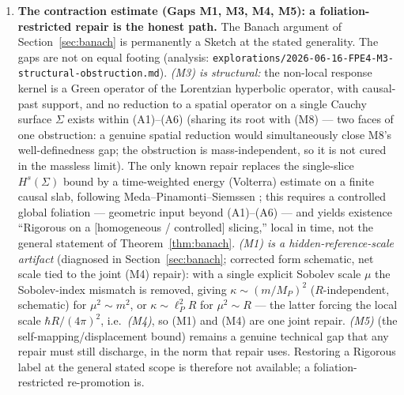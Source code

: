 \documentclass[12pt,a4paper]{article}
\begin{document}
\begin{enumerate}

\item \textbf{The contraction estimate (Gaps M1, M3, M4, M5): a foliation-restricted
repair is the honest path.} The Banach argument of Section~\ref{sec:banach} is
permanently a Sketch at the stated generality. The gaps are not on equal footing
(analysis: \texttt{explorations/2026-06-16-FPE4-M3-structural-obstruction.md}).
\emph{(M3) is structural:} the non-local response kernel is a Green operator of the
Lorentzian hyperbolic operator, with causal-past support, and no reduction to a spatial
operator on a single Cauchy surface $\Sigma$ exists within (A1)--(A6) (sharing its root
with (M8) --- two faces of one obstruction: a genuine spatial reduction would simultaneously
close M8's well-definedness gap; the obstruction is mass-independent, so it is not cured
in the massless limit). The
only known repair replaces the single-slice $H^s(\Sigma)$ bound by a time-weighted energy
(Volterra) estimate on a finite causal slab, following Meda--Pinamonti--Siemssen
\cite{meda_pinamonti_siemssen,pinamonti_siemssen}; this requires a controlled global
foliation --- geometric input beyond (A1)--(A6) --- and yields existence ``Rigorous on a
[homogeneous / controlled] slicing,'' local in time, not the general statement of
Theorem~\ref{thm:banach}. \emph{(M1) is a hidden-reference-scale artifact} (diagnosed in Section~\ref{sec:banach};
corrected form schematic, net scale tied to the joint (M4) repair): with a single explicit
Sobolev scale $\mu$ the Sobolev-index mismatch is removed, giving $\kappa\sim(m/M_P)^2$
($R$-independent, schematic) for $\mu^2\sim m^2$, or $\kappa\sim\ell_P^2 R$ for
$\mu^2\sim R$ --- the latter forcing the local scale $\hbar R/(4\pi)^2$, i.e.\
\emph{(M4)}, so (M1) and (M4) are one joint repair. \emph{(M5)} (the self-mapping/displacement bound) remains a genuine technical gap
that any repair must still discharge, in the norm that repair uses. Restoring a Rigorous
label at the general stated scope is therefore not available; a foliation-restricted
re-promotion is.


\end{enumerate}
\end{document}
